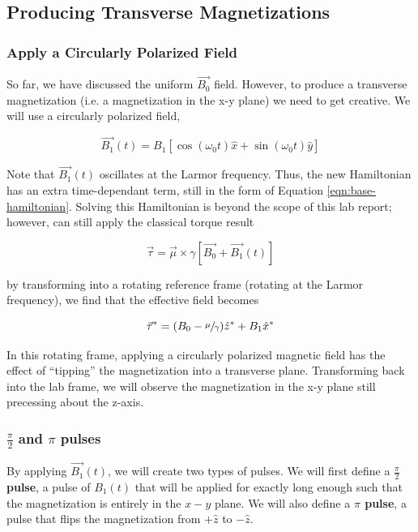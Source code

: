 \documentclass[
    floatfix,  %
    reprint,
    amsmath,amssymb,
    aps,
]{revtex4-2}
\newcommand{\halfpi}{\frac{\pi}{2}}
\begin{document}
\subsection{\label{sec:tipping}Producing Transverse Magnetizations}

\subsubsection{Apply a Circularly Polarized Field}

So far, we have discussed the uniform $\vec{B_0}$ field. However, to produce a transverse magnetization (i.e. a magnetization in the x-y plane) we need to get creative. We will use a circularly polarized field,

\begin{equation}
    \vec{B_1}(t) = B_1\left[\cos(\omega_0t)\hat{x}+\sin(\omega_0t)\hat{y}\right]
\end{equation}

Note that $\vec{B_1}(t)$ oscillates at the Larmor frequency. Thus, the new Hamiltonian has an extra time-dependant term, still in the form of Equation \ref{eqn:base-hamiltonian}. Solving this Hamiltonian is beyond the scope of this lab report; however, can still apply the classical torque result \cite{principles-resonance}

\begin{equation}
    \vec{\tau} = \vec{\mu} \times \gamma \left[\vec{B_0}+\vec{B_1}(t)\right]
\end{equation}

by transforming into a rotating reference frame (rotating at the Larmor frequency), we find that the effective field becomes

\begin{equation}
    \vec{\tau}^* = (B_0 - \sfrac{\mu}{\gamma}) \hat{z}^*+ B_1 \hat{x}^*
\end{equation}

In this rotating frame, applying a circularly polarized magnetic field has the effect of ``tipping'' the magnetization into a transverse plane. Transforming back into the lab frame, we will observe the magnetization in the x-y plane still precessing about the z-axis.
\subsubsection{$\halfpi$ and $\pi$ pulses}

By applying $\vec{B_1}(t)$, we will create two types of pulses. We will first define a \textbf{$\halfpi$ pulse}, a pulse of $B_1(t)$ that will be applied for exactly long enough such that the magnetization is entirely in the $x-y$ plane. We will also define a \textbf{$\pi$ pulse}, a pulse that flips the magnetization from $+\hat{z}$ to $-\hat{z}$.
\end{document}
